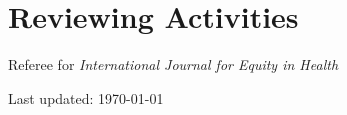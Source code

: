 \documentclass[a4paper,10pt]{article}
\begin{document}
\section{Reviewing Activities}
Referee for \emph{International Journal for Equity in Health}\\



\vfill{}
\begin{center}
{\scriptsize  Last updated: \today\- }
\end{center}
\end{document}
